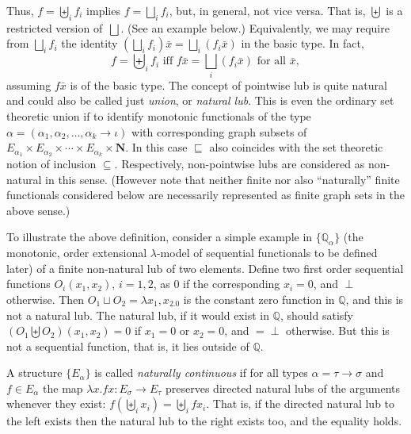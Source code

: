 \documentclass[fleqn]{LMCS}
\theoremstyle{plain}\newtheorem{satz}[thm]{Satz}
\theoremstyle{plain}\newtheorem{hyp}[thm]{Hypothesis}
\theoremstyle{plain}\newtheorem{hyps}[thm]{Hypotheses}
\theoremstyle{definition}\newtheorem{note}[thm]{Note}
\newcommand{\setof}[1]{\{#1\}}
\newcommand{\pointwiselub}{\biguplus}
\newcommand{\arr}{\rightarrow}
\newcommand{\NN}{\mathbf{N}}
\newcommand{\bbQ}{\mathbb{Q}}
\newcommand{\Undef}{{\perp}}
\newcommand{\bx}{\bar{x}}
\newcommand{\?}{\mbox{?}}
\begin{document}
\noindent
Thus, $f=\pointwiselub_i f_i$ implies $f=\bigsqcup_i f_i$, but, in general, 
not vice versa. 
That is, $\pointwiselub$ is a restricted version of~$\bigsqcup$. 
(See an example below.) 
Equivalently, we may require from $\bigsqcup_i f_i$ the identity 
$(\bigsqcup_i f_i)\bx=\bigsqcup_i (f_i \bx)$ 
in the basic type.\label{page:pointwise-lub}
In fact, 
\begin{equation}\label{eq:pointwise-lub}
f=\pointwiselub_i f_i\textrm{ iff } f\bx=\bigsqcup_i (f_i\bx)
\textrm{ for all }\bx,
\end{equation}
assuming $f\bx$ is of the basic type. 
The concept of pointwise lub is quite natural and could also be called 
just \emph{union}, or \emph{natural lub}. 
This is even the ordinary set theoretic union 
if to identify monotonic functionals of the type 
$\alpha=(\alpha_1,\alpha_2,\ldots,\alpha_k\arr\iota)$ 
with corresponding graph subsets of 
$E_{\alpha_1}\times E_{\alpha_2}\times\cdots\times E_{\alpha_k}\times\NN$. 
In this case $\sqsubseteq$ also coincides with the set theoretic notion of inclusion 
$\subseteq$. 
Respectively, non-pointwise lubs are considered as non-natural in this sense. 
(However note that neither finite nor also ``naturally'' finite functionals 
considered below are necessarily represented as finite graph sets in the above sense.) 


\begin{exa}\label{ex:O_i}To illustrate the above definition, 
consider a simple example in $\setof{\bbQ_\alpha}$ (the monotonic, 
order extensional $\lambda$-model of sequential functionals 
to be defined later) of a finite non-natural lub of two 
elements. 
Define two first order sequential functions 
$O_i(x_1,x_2)$, $i=1,2$, 
as $0$ if the corresponding $x_i=0$, and $\Undef$ otherwise. 
Then  
$O_1\sqcup O_2=\lambda x_1,x_2.0$ is the constant zero function 
in $\bbQ$, and this is not a natural  lub. 
The natural  lub, if it would exist in $\bbQ$, should satisfy 
$(O_1\pointwiselub O_2)(x_1,x_2)=0$ if $x_1=0$ or $x_2=0$, 
and ${}=\Undef$ otherwise. But this is not a sequential function, 
that is, it lies outside of $\bbQ$. 
\end{exa}



\begin{defi}A structure $\setof{E_{\alpha}}$ is called \emph{naturally  {continuous}} 
if for all types $\alpha=\tau\arr\sigma$ and $f\in E_\alpha$ the map
$
\lambda x.fx:
E_{\sigma}\arr E_{\tau}
$ 
preserves directed natural lubs of the arguments whenever they exist:
\label{page:pointwise-continuity}
$
f(\pointwiselub_i x_i)=\pointwiselub_i fx_i
$.
That is, if the directed natural lub to the left exists then 
the natural lub to the right exists too, and the equality holds. 
\end{defi}
\end{document}
